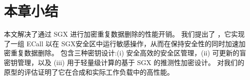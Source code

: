 \section{本章小结}
\label{sec:sgxdedup-sgxdedup-conclusion}

本文解决了通过 SGX 进行加密重复数据删除的性能开销。 我们提出了 \sysnameS，它实现了一组 ECall 以在 SGX安全区中运行敏感操作，从而在保持安全性的同时加速加密重复数据删除。 \sysnameS 包含三种密钥设计:(i) 安全高效的安全区管理，(ii) 可更新的盲密钥管理，以及 (iii) 用于轻量级计算的基于 SGX 的推测性加密设计。 对我们的 \sysnameS 原型的评估证明了它在合成和实际工作负载中的高性能。